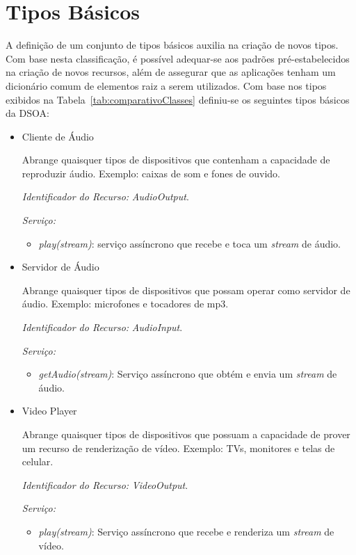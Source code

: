 \section{Tipos Básicos}
\label{sec:tiposBasicos}

A definição de um conjunto de tipos básicos auxilia na criação de novos tipos. Com base nesta classificação, é possível adequar-se aos padrões pré-estabelecidos na criação de novos recursos, além de assegurar que as aplicações tenham um dicionário comum de elementos raiz a serem utilizados. Com base nos tipos exibidos na Tabela~\ref{tab:comparativoClasses} definiu-se os seguintes tipos básicos da DSOA:

\begin{itemize}
	\item Cliente de Áudio
		
		Abrange quaisquer tipos de dispositivos que contenham a capacidade de reproduzir áudio. Exemplo: caixas de som e fones de ouvido.

		\emph{Identificador do Recurso:} \emph{AudioOutput}.

		\emph{Serviço:}
		\begin{itemize}
			\item \emph{play(stream)}: serviço assíncrono que recebe e toca um \emph{stream} de áudio.
		\end{itemize}

	\item Servidor de Áudio
		
		Abrange quaisquer tipos de dispositivos que possam operar como servidor de áudio. Exemplo: microfones e tocadores de mp3.

		\emph{Identificador do Recurso:} \emph{AudioInput}.

		\emph{Serviço:}
		\begin{itemize}
			\item \emph{getAudio(stream)}: Serviço assíncrono que obtém e envia um \emph{stream} de áudio.
		\end{itemize}

	\item Video Player
		
		Abrange quaisquer tipos de dispositivos que possuam a capacidade de prover um recurso de renderização de vídeo. Exemplo: TVs, monitores e telas de celular.

		\emph{Identificador do Recurso:} \emph{VideoOutput}.

		\emph{Serviço:} 
		\begin{itemize}
			\item \emph{play(stream)}: Serviço assíncrono que recebe e renderiza um \emph{stream} de vídeo.
		\end{itemize}


\end{itemize}
